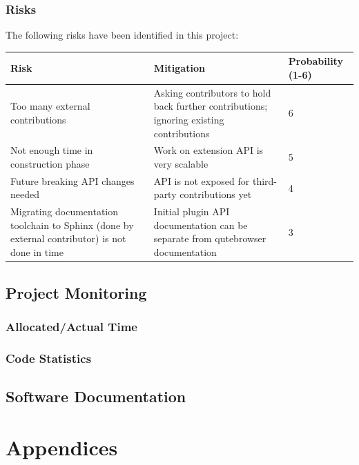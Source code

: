 \documentclass[a4paper,parskip=full]{scrreprt}
\begin{document}
\section{Risks}
The following risks have been identified in this project:

\begin{table}[h!]
  \begin{tabulary}{\linewidth}{LLl}
    \toprule
    Risk & Mitigation & Probability (1-6) \\
    \midrule
    Too many external contributions & Asking contributors to hold back further contributions; ignoring existing contributions & 6 \\
    \hline
    Not enough time in construction phase & Work on extension API is very
    scalable & 5 \\
    \hline
    Future breaking API changes needed & API is not exposed for third-party
    contributions yet & 4 \\
    \hline
    Migrating documentation toolchain to Sphinx (done by external contributor)
    is not done in time & Initial plugin API documentation can be separate from
    qutebrowser documentation & 3 \\
    \bottomrule
  \end{tabulary}
\end{table}

\chapter{Project Monitoring}
\section{Allocated/Actual Time}
\section{Code Statistics}


\chapter{Software Documentation}



\part{Appendices}
\end{document}
